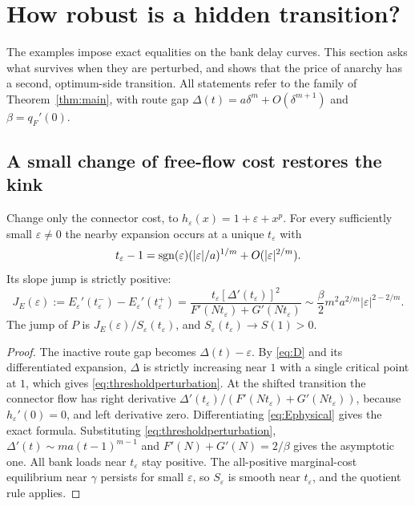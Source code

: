 \section{How robust is a hidden transition?}\label{sec:robustness}

The examples impose exact equalities on the bank delay curves. This section asks what survives when they are perturbed, and shows that the price of anarchy has a second, optimum-side transition. All statements refer to the family of Theorem~\ref{thm:main}, with route gap $\Delta(t)=a\delta^m+O(\delta^{m+1})$ and $\beta=q_F'(0)$.

\subsection{A small change of free-flow cost restores the kink}

\begin{proposition}\label{prop:perturbation}
Change only the connector cost, to $h_\varepsilon(x)=1+\varepsilon+x^p$. For every sufficiently small $\varepsilon\ne0$ the nearby expansion occurs at a unique $t_\varepsilon$ with
\begin{equation}\label{eq:thresholdperturbation}
 t_\varepsilon-1=\operatorname{sgn}(\varepsilon)(|\varepsilon|/a)^{1/m}+O(|\varepsilon|^{2/m}).
\end{equation}
Its slope jump is strictly positive:
\begin{equation}\label{eq:exactperturbation}
 J_E(\varepsilon):=E_\varepsilon'(t_\varepsilon^-)-E_\varepsilon'(t_\varepsilon^+)=\frac{t_\varepsilon[\Delta'(t_\varepsilon)]^2}{F'(Nt_\varepsilon)+G'(Nt_\varepsilon)}\sim\frac\beta2m^2a^{2/m}|\varepsilon|^{2-2/m}.
\end{equation}
The jump of $P$ is $J_E(\varepsilon)/S_\varepsilon(t_\varepsilon)$, and $S_\varepsilon(t_\varepsilon)\to S(1)>0$.
\end{proposition}
\begin{proof}
The inactive route gap becomes $\Delta(t)-\varepsilon$. By \eqref{eq:D} and its differentiated expansion, $\Delta$ is strictly increasing near $1$ with a single critical point at $1$, which gives \eqref{eq:thresholdperturbation}. At the shifted transition the connector flow has right derivative $\Delta'(t_\varepsilon)/(F'(Nt_\varepsilon)+G'(Nt_\varepsilon))$, because $h_\varepsilon'(0)=0$, and left derivative zero. Differentiating \eqref{eq:Ephysical} gives the exact formula. Substituting \eqref{eq:thresholdperturbation}, $\Delta'(t)\sim ma(t-1)^{m-1}$ and $F'(N)+G'(N)=2/\beta$ gives the asymptotic one. All bank loads near $t_\varepsilon$ stay positive. The all-positive marginal-cost equilibrium near $\gamma$ persists for small $\varepsilon$, so $S_\varepsilon$ is smooth near $t_\varepsilon$, and the quotient rule applies.
\end{proof}

